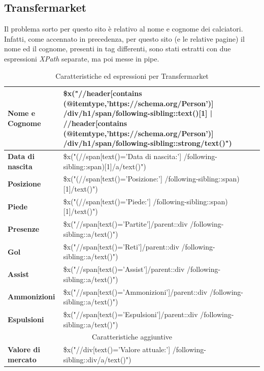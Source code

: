 \subsection{Transfermarket}\label{se:transfermarket}
Il problema sorto per questo sito è relativo al nome e cognome dei calciatori. Infatti, come accennato in precedenza, per questo sito (e le relative pagine) il nome ed il cognome, presenti in tag differenti, sono stati estratti con due espressioni \textit{XPath} separate, ma poi messe in pipe.
\begin{table}[h!]
    \centering
    \begin{tabular}{|l|>{\color{xpath}}l|}
    \hline
        \textbf{Nome e Cognome} & \thead{\$x("//header[contains\\(@itemtype,'https://schema.org/Person')]\\/div/h1/span/following-sibling::text()[1] |\\ //header[contains\\(@itemtype,'https://schema.org/Person')]\\/div/h1/span/following-sibling::strong/text()")} \\
    \hline
        \textbf{Data di nascita} & \thead{\$x("(//span[text()='Data di nascita:']\\/following-sibling::span)[1]/a/text()")}\\
    \hline
        \textbf{Posizione} & \thead{\$x("(//span[text()='Posizione:']\\/following-sibling::span)[1]/text()")}\\
    \hline
        \textbf{Piede} & \thead{\$x("(//span[text()='Piede:']\\/following-sibling::span)[1]/text()")}\\
    \hline
        \textbf{Presenze} & \thead{\$x("//span[text()='Partite']/parent::div\\/following-sibling::a/text()")} \\
    \hline
        \textbf{Gol} & \thead{\$x("//span[text()='Reti']/parent::div\\/following-sibling::a/text()")}\\
    \hline
        \textbf{Assist} & \thead{\$x("//span[text()='Assist']/parent::div\\/following-sibling::a/text()")}\\
    \hline
        \textbf{Ammonizioni} & \thead{\$x("//span[text()='Ammonizioni']/parent::div\\/following-sibling::a/text()")}\\
    \hline
        \textbf{Espulsioni} & \thead{\$x("//span[text()='Espulsioni']/parent::div\\/following-sibling::a/text()")}\\
    \hline
    \multicolumn{2}{|c|}{Caratteristiche aggiuntive} \\
    \hline
        \textbf{Valore di mercato} & \thead{\$x("//div[text()='Valore attuale:']\\/following-sibling::div/a/text()")}\\
    \hline
    \end{tabular}
    \caption{Caratteristiche ed espressioni per Transfermarket}
    \label{tab:my_label}
\end{table}
